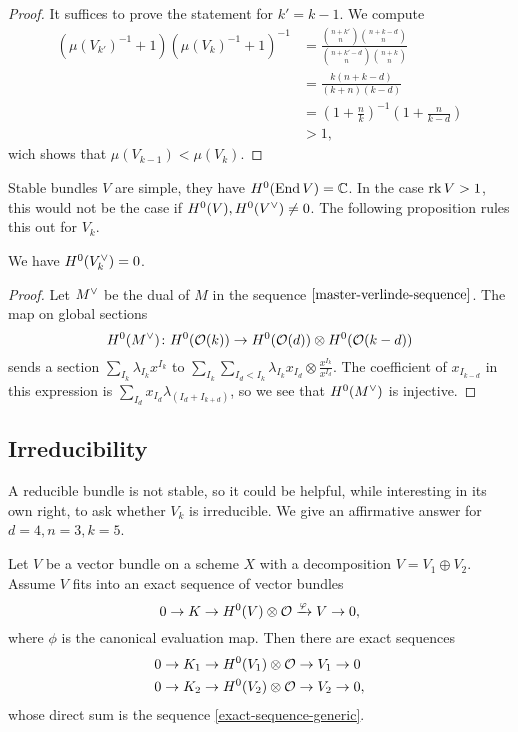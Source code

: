 \begin{proof}
	It suffices to prove the statement for $k'=k-1$. We compute
	\begin{align*}
		(\mu(V_{k'})^{-1}+1)(\mu(V_{k})^{-1}+1)^{-1}
		&= \frac{\binom{n+k'}{n}\binom{n+k-d}{n}}
		{\binom{n+k'-d}{n}\binom{n+k}{n}}
		\\ &= \frac{k(n+k-d)}{(k+n)(k-d)}
		\\ &= \left(1+\frac{n}{k}\right)^{-1}
		\left(1+\frac{n}{k-d}\right)
		\\ &> 1,
	\end{align*}
	wich shows that $\mu(V_{k-1}) < \mu(V_{k})$.
\end{proof}

Stable bundles $V$ are simple, \ie they have $H^0(\operatorname{End}{V})=\mathbb{C}$. In the case $\operatorname{rk} V > 1$, this would not be the case if
$H^0(V),H^0(V^\vee) \neq 0$. The following proposition rules this out for $V_k$.

\begin{proposition}
	We have $H^{0}(V^\vee_k) = 0$.
\end{proposition}
\begin{proof}
	Let $M^\vee$ be the dual of $M$ in the sequence $\cref{master-verlinde-sequence}$. The map on global sections
	\[
		H^0(M^\vee)\colon
		H^0(\mathcal{O}(k))
		\to
		H^0(\mathcal{O}(d))\otimes H^0(\mathcal{O}(k-d))
	\]
	sends a section $\sum_{I_k} \lambda_{I_k} x^{I_k}$ to
	$\sum_{I_k} \sum_{I_d < I_k} \lambda_{I_k} x_{I_d} \otimes \frac{x^{I_k}}{x^{I_d}}$. The coefficient of $x_{I_{k-d}}$ in this expression is
	$\sum_{I_d} x_{I_d}\lambda_{(I_d+I_{k+d})}$, so we see that
	$H^0(M^\vee)$ is injective.
\end{proof}

\subsection{Irreducibility}

A reducible bundle is not stable, so it could be helpful, while interesting in its own right, to ask whether $V_k$ is irreducible. We give an affirmative answer for $d=4, n=3, k=5$.

\begin{lemma} \label{splitting-propagates}
	Let $V$ be a vector bundle on a scheme $X$ with a decomposition $V=V_1\oplus V_2$. Assume $V$ fits into an exact sequence of vector bundles
	\begin{equation} \label{exact-sequence-generic}
		0\to{K}\to {H^0(V)\otimes \mathcal{O}}\xrightarrow{\varphi}{V}\to 0,
	\end{equation}
	where $\phi$ is the canonical evaluation map.
	Then there are exact sequences
	\begin{align*}
		0 \to K_1 \to H^0(V_1)\otimes \mathcal{O} \to V_1 \to 0& \\
		0 \to K_2 \to H^0(V_2)\otimes \mathcal{O} \to V_2 \to 0&,
	\end{align*}
	whose direct sum is the sequence
	\cref{exact-sequence-generic}.
\end{lemma}

